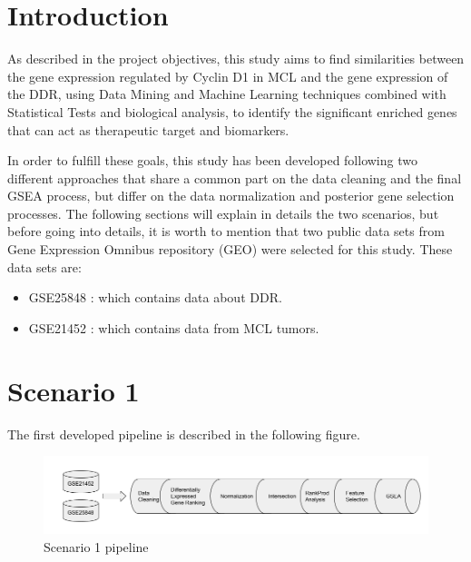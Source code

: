 
\section{Introduction}
As described in the project objectives, this study aims to find similarities between the gene expression regulated by Cyclin D1 in MCL and the gene expression of the DDR, using Data Mining and Machine Learning techniques combined with Statistical Tests and biological analysis, to identify the significant enriched genes that can act as therapeutic target and biomarkers.

In order to fulfill these goals, this study has been developed following two different approaches that share a common part on the data cleaning and the final GSEA process, but differ on the data normalization and posterior gene selection processes. The following sections will explain in details the two scenarios, but before going into details, it is worth to mention that two public data sets from Gene Expression Omnibus repository (GEO) were selected for this study. These data sets are:

\begin{itemize}
    \item GSE25848 \cite{ddrData:2011}: which contains data about DDR.
    \item GSE21452 \cite{mclData:2011}: which contains data from MCL tumors.
\end{itemize}

\newpage
\section{Scenario 1}

The first developed pipeline is described in the following figure.

\begin{figure}[h]
    \centering
    \includegraphics[scale=0.5]{../figs/scenario_1_figure.png}
    \caption{Scenario 1 pipeline}
    \label{fig:scenario-1}
\end{figure}

